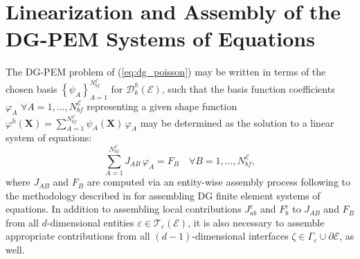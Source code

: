 \section{Linearization and Assembly of the \\ DG-PEM Systems of Equations}

	The DG-PEM problem of (\ref{eq:dg_poisson}) may be written in terms of the chosen basis $\left\{ \psi_A \right\}_{A=1}^{N^\mathcal{E}_{bf}}$ for $\mathcal{D}^h_k (\mathcal{E})$, such that the basis function coefficients $\varphi_A \, \, \forall A = 1, \ldots, N^\mathcal{E}_{bf}$ representing a given shape function $\varphi^h (\mathbf{X}) = \sum_{A=1}^{N^\mathcal{E}_{bf}} \psi_A (\mathbf{X}) \, \varphi_A$ may be determined as the solution to a linear system of equations:
	\begin{equation}
		\sum_{A=1}^{N^\mathcal{E}_{bf}} J_{AB} \, \varphi_A = F_B \quad \forall B = 1, \ldots, N^\mathcal{E}_{bf},
		\label{eq:linearization_dgpem}
	\end{equation}
	where $J_{AB}$ and $F_B$ are computed via an entity-wise assembly process following to the methodology described in \cite{Riviere:08} for assembling DG finite element systems of equations. In addition to assembling local contributions $J^\varepsilon_{ab}$ and $F^\varepsilon_b$ to $J_{AB}$ and $F_B$ from all $d$-dimensional entities $\varepsilon \in \mathcal{T}_\varepsilon (\mathcal{E})$, it is also necessary to assemble appropriate contributions from all $(d-1)$-dimensional interfaces $\zeta \in \Gamma_\varepsilon \cup \partial \mathcal{E}$, as well.


